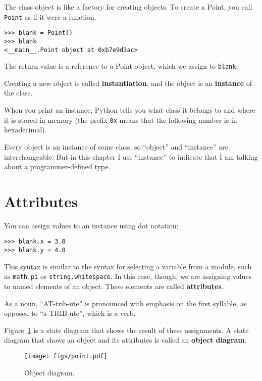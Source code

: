 \documentclass[10pt]{book}
\begin{document}
The class object is like a factory for creating objects.  To create a
Point, you call {\tt Point} as if it were a function.

\begin{verbatim}
>>> blank = Point()
>>> blank
<__main__.Point object at 0xb7e9d3ac>
\end{verbatim}
%
The return value is a reference to a Point object, which we
assign to {\tt blank}.  

Creating a new object is called
{\bf instantiation}, and the object is an {\bf instance} of
the class.

When you print an instance, Python tells you what class it
belongs to and where it is stored in memory (the prefix
{\tt 0x} means that the following number is in hexadecimal).

Every object is an instance of some class, so ``object'' and
``instance'' are interchangeable.  But in this chapter I use
``instance'' to indicate that I am talking about a programmer-defined
type.


\section{Attributes}
\label{attributes}

You can assign values to an instance using dot notation:

\begin{verbatim}
>>> blank.x = 3.0
>>> blank.y = 4.0
\end{verbatim}
%
This syntax is similar to the syntax for selecting a variable from a
module, such as {\tt math.pi} or {\tt string.whitespace}.  In this case,
though, we are assigning values to named elements of an object.
These elements are called {\bf attributes}.

As a noun, ``AT-trib-ute'' is pronounced with emphasis on the first
syllable, as opposed to ``a-TRIB-ute'', which is a verb.

Figure~\ref{fig.point} is a state diagram that shows the result of these assignments.
A state diagram that shows an object and its attributes is
called an {\bf object diagram}.

\begin{figure}
\centerline
{\texttt{[image: figs/point.pdf]}}
\caption{Object diagram.}
\label{fig.point}
\end{figure}
\end{document}

